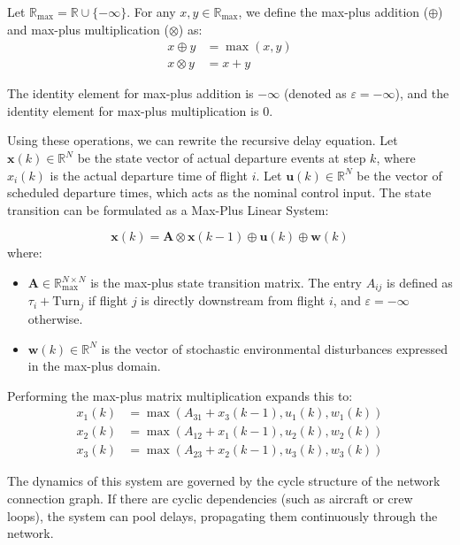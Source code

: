 \documentclass[11pt,a4paper]{book}
\begin{document}
Let $\mathbb{R}_{\max} = \mathbb{R} \cup \{-\infty\}$. For any $x, y \in \mathbb{R}_{\max}$, we define the max-plus addition ($\oplus$) and max-plus multiplication ($\otimes$) as:
\begin{align}
x \oplus y &= \max(x, y) \\
x \otimes y &= x + y
\end{align}

The identity element for max-plus addition is $-\infty$ (denoted as $\varepsilon = -\infty$), and the identity element for max-plus multiplication is $0$.

Using these operations, we can rewrite the recursive delay equation. Let $\mathbf{x}(k) \in \mathbb{R}^N$ be the state vector of actual departure events at step $k$, where $x_i(k)$ is the actual departure time of flight $i$. Let $\mathbf{u}(k) \in \mathbb{R}^N$ be the vector of scheduled departure times, which acts as the nominal control input. The state transition can be formulated as a Max-Plus Linear System:

\begin{equation}
\mathbf{x}(k) = \mathbf{A} \otimes \mathbf{x}(k-1) \oplus \mathbf{u}(k) \oplus \mathbf{w}(k)
\end{equation}
where:
\begin{itemize}
    \item $\mathbf{A} \in \mathbb{R}_{\max}^{N \times N}$ is the max-plus state transition matrix. The entry $A_{ij}$ is defined as $\tau_i + \text{Turn}_j$ if flight $j$ is directly downstream from flight $i$, and $\varepsilon = -\infty$ otherwise.
    \item $\mathbf{w}(k) \in \mathbb{R}^N$ is the vector of stochastic environmental disturbances expressed in the max-plus domain.
\end{itemize}

Performing the max-plus matrix multiplication expands this to:
\begin{align}
x_1(k) &= \max\left( A_{31} + x_3(k-1), u_1(k), w_1(k) \right) \\
x_2(k) &= \max\left( A_{12} + x_1(k-1), u_2(k), w_2(k) \right) \\
x_3(k) &= \max\left( A_{23} + x_2(k-1), u_3(k), w_3(k) \right)
\end{align}

The dynamics of this system are governed by the cycle structure of the network connection graph. If there are cyclic dependencies (such as aircraft or crew loops), the system can pool delays, propagating them continuously through the network.
\end{document}
